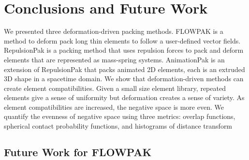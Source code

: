 
\chapter{Conclusions and Future Work}
\label{chapter_conclusions_and_future_work}


We presented three deformation-driven packing methods.
FLOWPAK is a method to deform pack long thin elements
to follow a user-defined vector fields.
RepulsionPak is a packing method that uses repulsion forces to pack and deform
elements that are represented as mass-spring systems.
AnimationPak is an extension of RepulsionPak that packs animated 2D elements,
each is an extruded 3D shape in a spacetime domain.
We show that deformation-driven methods can create element compatibilities.
Given a small size element library, repeated elements
give a sense of uniformity but deformation creates a sense of variety.
As element compatibilities are increased,
the negative space is more even.
We quantify the evenness of negative space using three metrics:
overlap functions, spherical contact probability functions, and histograms of distance transform


\section{Future Work for FLOWPAK}



